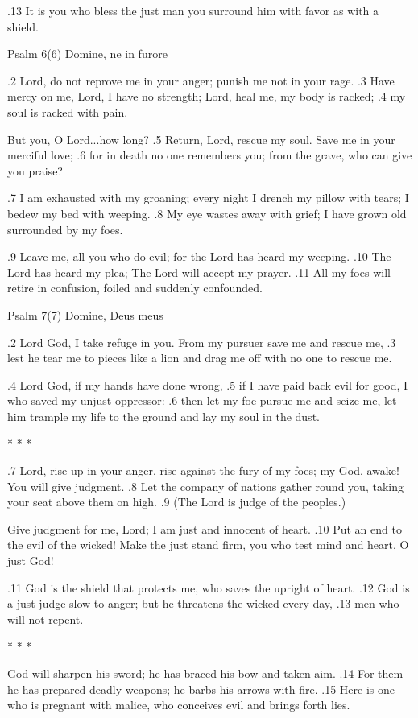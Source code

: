 .13 It is you who bless the just man
you surround him with favor as with a shield.


Psalm 6(6) Domine, ne in furore

.2 Lord, do not reprove me in your anger;
punish me not in your rage.
.3 Have mercy on me, Lord, I have no strength;
Lord, heal me, my body is racked;
.4 my soul is racked with pain.

But you, O Lord...how long?
.5 Return, Lord, rescue my soul.
Save me in your merciful love;
.6 for in death no one remembers you;
from the grave, who can give you praise?

.7 I am exhausted with my groaning;
every night I drench my pillow with tears;
I bedew my bed with weeping.
.8 My eye wastes away with grief;
I have grown old surrounded by my foes.

.9 Leave me, all you who do evil;
for the Lord has heard my weeping.
.10 The Lord has heard my plea;
The Lord will accept my prayer.
.11 All my foes will retire in confusion,
foiled and suddenly confounded.


Psalm 7(7) Domine, Deus meus

.2 Lord God, I take refuge in you.
From my pursuer save me and rescue me,
.3 lest he tear me to pieces like a lion
and drag me off with no one to rescue me.

.4 Lord God, if my hands have done wrong,
.5 if I have paid back evil for good,
I who saved my unjust oppressor:
.6 then let my foe pursue me and seize me,
let him trample my life to the ground
and lay my soul in the dust.

* * *

.7 Lord, rise up in your anger,
rise against the fury of my foes;
my God, awake! You will give judgment.
.8 Let the company of nations gather round you,
taking your seat above them on high.
.9 (The Lord is judge of the peoples.)

Give judgment for me, Lord; I am just
and innocent of heart.
.10 Put an end to the evil of the wicked!
Make the just stand firm,
you who test mind and heart,
O just God!

.11 God is the shield that protects me,
who saves the upright of heart.
.12 God is a just judge
slow to anger;
but he threatens the wicked every day,
.13 men who will not repent.

* * *

God will sharpen his sword;
he has braced his bow and taken aim.
.14 For them he has prepared deadly weapons;
he barbs his arrows with fire.
.15 Here is one who is pregnant with malice,
who conceives evil and brings forth lies.

